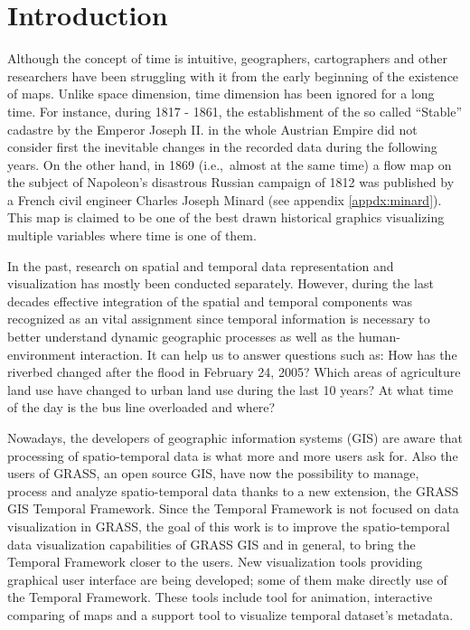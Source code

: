 \documentclass[a4paper,12pt,oneside]{book}
\title{}
\author{Anna Kratochvílová}
\newcommand{\tf}{Temporal Framework\xspace}
\begin{document}
\pagestyle{empty}


\cleardoublepage


% 
% 

\cleardoublepage




\tableofcontents
\cleardoublepage
\pagestyle{fancy}
\chapter*{Introduction}
Although the concept of time is intuitive, geographers, cartographers and other researchers have been
struggling with it from the early beginning of the existence of maps.
Unlike space dimension, time dimension has been ignored for a long time. For instance,
during 1817 - 1861, the establishment of the so called ``Stable''  cadastre by the Emperor Joseph II. 
in the whole Austrian Empire did not consider first the inevitable changes in the recorded data during the following years.
On the other hand, in 1869 (i.e.,\ almost at the same time)
a flow map on the subject of Napoleon's disastrous Russian campaign of 1812 was
published by a French civil engineer Charles Joseph Minard (see appendix \ref{appdx:minard}). This map is claimed to be
one of the best drawn historical graphics visualizing multiple variables where time is one of them.

In the past, research on spatial and temporal data representation and visualization
has mostly been conducted separately. However, during the last decades
effective integration of the spatial and temporal components was recognized as an vital assignment
since temporal information is necessary to better understand dynamic geographic processes
as well as the human-environment interaction. It can help us to answer questions such as:
How has the riverbed changed after the flood in February 24, 2005?
Which areas of agriculture land use have changed to urban land use during the last 10 years?
At what time of the day is the bus line overloaded and where?

Nowadays, the developers of geographic information systems (GIS) are aware that
processing of spatio-temporal data is what more and more users ask for.
Also the users of GRASS, an open source GIS, have now the possibility to manage,
process and analyze spatio-temporal data thanks to a new extension, the GRASS GIS \tf.
Since the \tf is not focused on data visualization in GRASS, the goal of this work
is to improve the spatio-temporal data visualization capabilities of GRASS GIS and in general,
to bring the \tf closer to the users. New visualization tools providing graphical user interface
are being developed; some of them make directly use of the \tf. These tools include tool
for animation, interactive comparing of maps and a support tool to visualize temporal dataset's metadata.
\end{document}
